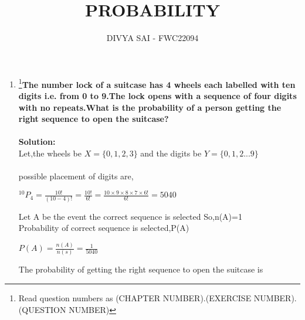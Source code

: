 \documentclass{article}
\begin{document}
\title{PROBABILITY}
\author{\Large DIVYA SAI - FWC22094}
\date{}

\maketitle

\begin{enumerate}[label=16.\arabic{enumi}.\arabic{enumii}]%
\setcounter{enumi}{3}
\setcounter{enumii}{10}

\item \footnote{Read question numbers as (CHAPTER NUMBER).(EXERCISE NUMBER).(QUESTION NUMBER)}\textbf {The number lock of a suitcase has 4 wheels each labelled with ten digits i.e. from 0 to 9.The lock opens with a sequence of four digits with no repeats.What is the probability of a person getting the right sequence to open the suitcase?}\\[1ex]
\hspace{160mm}\\
\textbf{Solution:}\\
Let,the wheels be $X =\lbrace{0,1,2,3}\rbrace$ and the digits be $Y=\lbrace{0,1,2...9}\rbrace$\\
\\
possible placement of digits are,
\begin{center}
$^{10}P_4=\frac{10!}{(10-4)!}=\frac{10!}{6!}=\frac{10 \times 9 \times 8 \times 7 \times	 6!}{6!}=5040$
\end{center}
Let A be the event the correct sequence is selected So,n(A)=1
\\Probability of correct sequence is selected,P(A)
\\
\begin{center}
$P(A)=\frac{n(A)}{n(s)}=\frac{1}{5040}$
\end{center}
The probability of getting the right sequence to open the suitcase is 
\end{enumerate}
\end{document}
